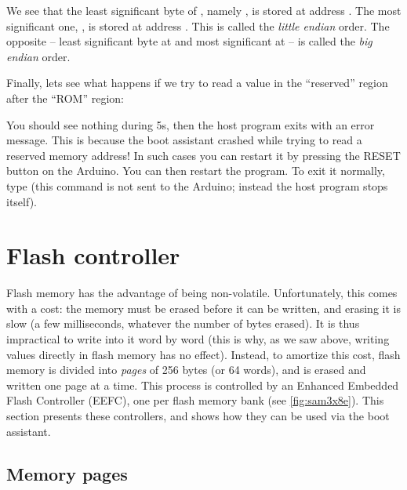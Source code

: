 
\noindent We see that the least significant byte of , namely
, is stored at address . The most significant one,
, is stored at address . This is called the {\em little
endian} order. The opposite -- least significant byte at  and
most significant at  -- is called the {\em big endian} order.

Finally, lets see what happens if we try to read a value in the ``reserved''
region after the ``ROM'' region:


\noindent You should see nothing during 5s, then the host program exits with an
error message. This is because the boot assistant crashed while trying to read
a reserved memory address! In such cases you can restart it by pressing the
RESET button on the Arduino. You can then restart the 
program. To exit it normally, type  (this command is not sent to
the Arduino; instead the host program stops itself).

\section{Flash controller}\label{section:flash-controller}

Flash memory has the advantage of being non-volatile. Unfortunately, this comes
with a cost: the memory must be erased before it can be written, and erasing it
is slow (a few milliseconds, whatever the number of bytes erased). It is thus
impractical to write into it word by word (this is why, as we saw above,
writing values directly in flash memory has no effect). Instead, to amortize
this cost, flash memory is divided into {\em pages} of 256 bytes (or 64 words),
and is erased and written one page at a time. This process is controlled by an
Enhanced Embedded Flash Controller (EEFC), one per flash memory bank (see
\cref{fig:sam3x8e}). This section presents these controllers, and shows how
they can be used via the boot assistant.

\subsection{Memory pages}\label{subsection:page-write}

